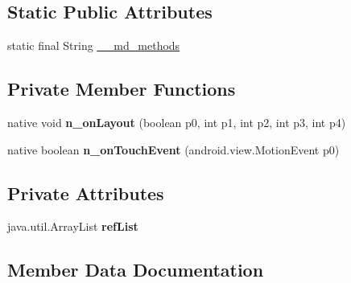 \subsection*{Static Public Attributes}
\begin{DoxyCompactItemize}
\item 
static final String \hyperlink{classmd57018357d52b54713cd814fbd5262dd1f_1_1FrameRenderer_a166d3c4d9a96ccf8eb5ff4a0bf70b76f}{\+\_\+\+\_\+md\+\_\+methods}
\end{DoxyCompactItemize}
\subsection*{Private Member Functions}
\begin{DoxyCompactItemize}
\item 
\mbox{\label{classmd57018357d52b54713cd814fbd5262dd1f_1_1FrameRenderer_a87f46153d75eb9e5c7125d71c81795a2}} 
native void {\bfseries n\+\_\+on\+Layout} (boolean p0, int p1, int p2, int p3, int p4)
\item 
\mbox{\label{classmd57018357d52b54713cd814fbd5262dd1f_1_1FrameRenderer_aa8a945d3dcb94555c8ceb309979a5a3d}} 
native boolean {\bfseries n\+\_\+on\+Touch\+Event} (android.\+view.\+Motion\+Event p0)
\end{DoxyCompactItemize}
\subsection*{Private Attributes}
\begin{DoxyCompactItemize}
\item 
\mbox{\label{classmd57018357d52b54713cd814fbd5262dd1f_1_1FrameRenderer_af8ecb51614566d34e3a28877de382591}} 
java.\+util.\+Array\+List {\bfseries ref\+List}
\end{DoxyCompactItemize}


\subsection{Member Data Documentation}
\mbox{\label{classmd57018357d52b54713cd814fbd5262dd1f_1_1FrameRenderer_a166d3c4d9a96ccf8eb5ff4a0bf70b76f}} 
